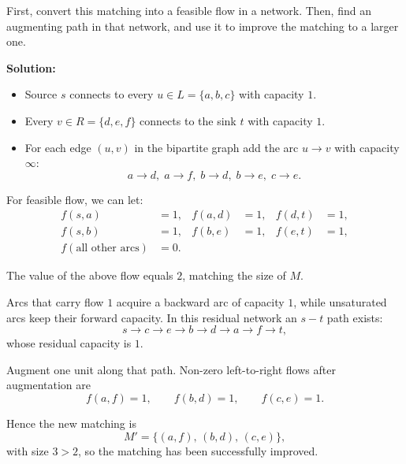 \documentclass{article}
\begin{document}
\begin{enumerate}
\begin{center}
    \end{center}

    First, convert this matching into a feasible flow in a network. Then, find an augmenting path in that network, and use it to improve the matching to a larger one.

    \textbf{Solution:}
\begin{itemize}
    \item Source \(s\) connects to every \(u\in L=\{a,b,c\}\) with capacity \(1\).
    \item Every \(v\in R=\{d,e,f\}\) connects to the sink \(t\) with capacity \(1\).
    \item For each edge \((u,v)\) in the bipartite graph add the arc \(u\to v\) with capacity \(\infty\):
          \[
          a\to d,\; a\to f,\; b\to d,\; b\to e,\; c\to e .
          \]
\end{itemize}

For feasible flow, we can let:
\begin{align*}
f(s,a)&=1, & f(a,d)&=1, & f(d,t)&=1,\\
f(s,b)&=1, & f(b,e)&=1, & f(e,t)&=1,\\
f(\text{all other arcs})&=0.
\end{align*}

The value of the above flow equals \(2\), matching the size of \(M\).

Arcs that carry flow \(1\) acquire a backward arc of capacity \(1\), while unsaturated arcs keep their forward capacity.
In this residual network an \(s\!-\!t\) path exists:
\[
s\to c\to e\to b\to d\to a\to f\to t,
\]
whose residual capacity is \(1\).

Augment one unit along that path.  
Non-zero left-to-right flows after augmentation are
\[
f(a,f)=1,\qquad
f(b,d)=1,\qquad
f(c,e)=1.
\]

Hence the new matching is
\[
M'=\{(a,f),\,(b,d),\,(c,e)\},
\]
with size \(3>2\), so the matching has been successfully improved.


\end{enumerate}
\end{document}
